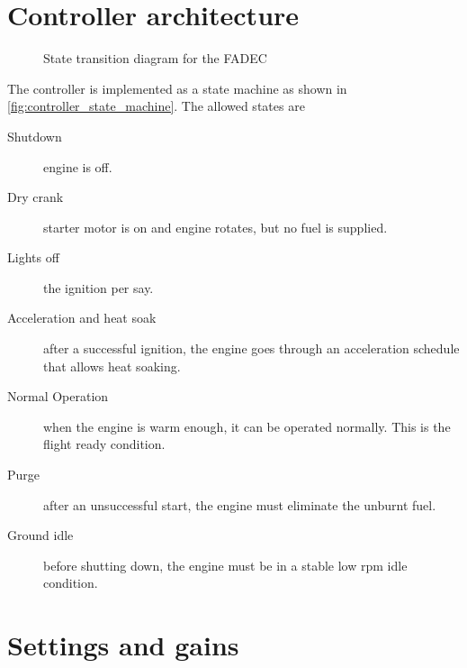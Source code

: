 \documentclass[tcc]{subfiles}
\begin{document}
\section{Controller architecture}
\begin{figure}[tp]
    \centering
    \caption{State transition diagram for the \acs{FADEC}}
    
    
    \source{\authorsfigure}
    \label{fig:controller_state_machine}
\end{figure}
The controller is implemented as a state machine \cite{amd_state_machine} 
 as shown in \autoref{fig:controller_state_machine}. 
The allowed states are
\begin{description}
    \item[Shutdown] engine is off. 
    \item[Dry crank] starter motor is on and engine rotates,
          but no fuel is supplied.
    \item[Lights off] the ignition per say. 
    \item[Acceleration and heat soak] after a successful ignition,
          the engine goes through an acceleration schedule that allows heat soaking. 
    \item[Normal Operation] when the engine is warm enough, it can be operated normally.
          This is the flight ready condition.
    \item[Purge] after an unsuccessful start, the engine must eliminate the unburnt fuel. 
    \item[Ground idle] before shutting down, the engine must be in a stable low rpm idle condition.
\end{description}


\section{Settings and gains}
\end{document}
